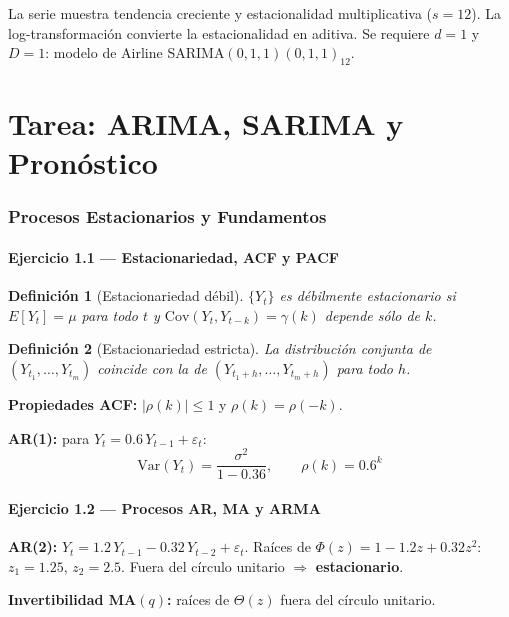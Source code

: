 \documentclass[12pt,letterpaper]{article}
\newtheorem{definition}{Definici\'on}[section]
\begin{document}
La serie muestra tendencia creciente y estacionalidad multiplicativa ($s=12$).
La log-transformaci\'on convierte la estacionalidad en aditiva. Se requiere
$d=1$ y $D=1$: modelo de Airline SARIMA$(0,1,1)(0,1,1)_{12}$.

\part{Tarea: ARIMA, SARIMA y Pron\'ostico}

\section{Procesos Estacionarios y Fundamentos}

\subsection*{Ejercicio 1.1 --- Estacionariedad, ACF y PACF}

\begin{definition}[Estacionariedad d\'ebil]
  $\{Y_t\}$ es d\'ebilmente estacionario si $E[Y_t]=\mu$ para todo $t$ y
  $\mathrm{Cov}(Y_t,Y_{t-k})=\gamma(k)$ depende s\'olo de $k$.
\end{definition}

\begin{definition}[Estacionariedad estricta]
  La distribuci\'on conjunta de $(Y_{t_1},\ldots,Y_{t_m})$ coincide con la de
  $(Y_{t_1+h},\ldots,Y_{t_m+h})$ para todo $h$.
\end{definition}

\textbf{Propiedades ACF:} $|\rho(k)|\leq 1$ y $\rho(k)=\rho(-k)$.

\textbf{AR(1):} para $Y_t=0.6\,Y_{t-1}+\varepsilon_t$:
\[
  \mathrm{Var}(Y_t)=\frac{\sigma^2}{1-0.36}, \qquad \rho(k)=0.6^k
\]

\subsection*{Ejercicio 1.2 --- Procesos AR, MA y ARMA}

\textbf{AR(2):} $Y_t=1.2\,Y_{t-1}-0.32\,Y_{t-2}+\varepsilon_t$.
Ra\'ices de $\Phi(z)=1-1.2z+0.32z^2$: $z_1=1.25$, $z_2=2.5$.
Fuera del c\'irculo unitario $\Rightarrow$ \textbf{estacionario}.

\textbf{Invertibilidad MA$(q)$:} ra\'ices de $\Theta(z)$ fuera del c\'irculo unitario.
\end{document}
